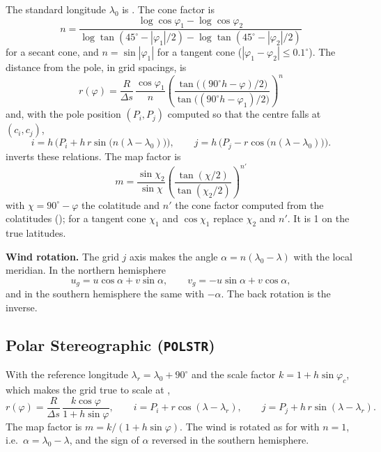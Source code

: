 The standard longitude $\lambda_0$ is . The cone factor is
\[
  n = \frac{\log\cos\varphi_1 - \log\cos\varphi_2}
           {\log\tan(45^\circ - |\varphi_1|/2) -
            \log\tan(45^\circ - |\varphi_2|/2)}
\]
for a secant cone, and $n = \sin|\varphi_1|$ for a tangent cone
($|\varphi_1 - \varphi_2| \le 0.1^\circ$). The distance from the pole, in
grid spacings, is
\[
  r(\varphi) = \frac{R}{\Delta s}\,\frac{\cos\varphi_1}{n}
    \left(\frac{\tan\bigl((90^\circ h - \varphi)/2\bigr)}
               {\tan\bigl((90^\circ h - \varphi_1)/2\bigr)}\right)^{n}
\]
and, with the pole position $(P_i, P_j)$ computed so that the centre falls
at $(c_i, c_j)$,
\[
  i = h\,\bigl(P_i + h\,r\sin\bigl(n(\lambda - \lambda_0)\bigr)\bigr),
  \qquad
  j = h\,\bigl(P_j - r\cos\bigl(n(\lambda - \lambda_0)\bigr)\bigr).
\]
 inverts these relations. The map factor is
\[
  m = \frac{\sin\chi_2}{\sin\chi}
      \left(\frac{\tan(\chi/2)}{\tan(\chi_2/2)}\right)^{n'}
\]
with $\chi = 90^\circ - \varphi$ the colatitude and $n'$ the cone factor
computed from the colatitudes (); for a tangent cone $\chi_1$
and $\cos\chi_1$ replace $\chi_2$ and $n'$. It is 1 on the true
latitudes.

\textbf{Wind rotation.} The grid $j$ axis makes the angle
$\alpha = n(\lambda_0 - \lambda)$ with the local meridian. In the northern
hemisphere
\[
  u_g = u\cos\alpha + v\sin\alpha, \qquad
  v_g = -u\sin\alpha + v\cos\alpha,
\]
and in the southern hemisphere the same with $-\alpha$. The back rotation
is the inverse.

\subsection{Polar Stereographic (\texttt{POLSTR})}
\label{subsec:proj_polar}

With the reference longitude $\lambda_r = \lambda_0 + 90^\circ$ and the
scale factor $k = 1 + h\sin\varphi_c$, which makes the grid true to scale at
,
\[
  r(\varphi) = \frac{R}{\Delta s}\,\frac{k\cos\varphi}{1 + h\sin\varphi},
  \qquad
  i = P_i + r\cos(\lambda - \lambda_r), \qquad
  j = P_j + h\,r\sin(\lambda - \lambda_r).
\]
The map factor is $m = k/(1 + h\sin\varphi)$. The wind is rotated as for
 with $n = 1$, i.e.\ $\alpha = \lambda_0 - \lambda$, and the
sign of $\alpha$ reversed in the southern hemisphere.

